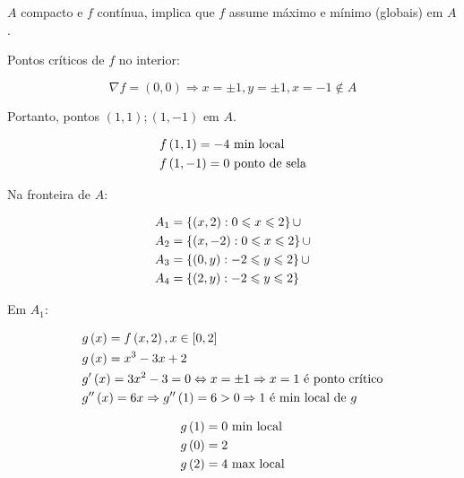 \documentclass[11pt, oneside, a4paper]{gsm-l}
\begin{document}
\begin{sol}
$A$ compacto e $f$ contínua, implica que $f$ assume máximo e mínimo (globais) em $A$.

Pontos críticos de $f$ no interior:

\[
    \nabla f = \left( {0,0} \right) \Rightarrow x =  \pm 1,y =  \pm 1,x =  - 1 \notin A
\]

Portanto, pontos $\left( {1,1} \right);\left( {1, - 1} \right)$ em $A$.

\[
\begin{gathered}
f\left( {1,1} \right) =  - 4{\text{ min local}} \hfill \\
f\left( {1, - 1} \right) = 0{\text{ ponto de sela}} \hfill \\
\end{gathered}
\]

Na fronteira de $A$:

\[
\begin{gathered}
      A_1  = \left\{ {\left( {x,2} \right):0 \leqslant x \leqslant 2} \right\} \cup  \hfill \\
      A_2  = \left\{ {\left( {x, - 2} \right):0 \leqslant x \leqslant 2} \right\} \cup  \hfill \\
      A_3  = \left\{ {\left( {0,y} \right): - 2 \leqslant y \leqslant 2} \right\} \cup  \hfill \\
      A_4  = \left\{ {\left( {2,y} \right): - 2 \leqslant y \leqslant 2} \right\} \hfill \\
\end{gathered}
\]

Em $A_1$:

\[
\begin{gathered}
      g\left( x \right) = f\left( {x,2} \right),x \in \left[ {0,2} \right] \hfill \\
g\left( x \right) = x^3  - 3x + 2 \hfill \\
      g'\left( x \right) = 3x^2  - 3 = 0 \Leftrightarrow x =  \pm 1 \Rightarrow x = 1{\text{ é ponto crítico}} \hfill \\
      g''\left( x \right) = 6x \Rightarrow g''\left( 1 \right) = 6 > 0 \Rightarrow 1{\text{ é min local de $g$}} \hfill \\
\end{gathered}
\]

\[
\begin{gathered}
g\left( 1 \right) = 0{\text{ min local}} \hfill \\
g\left( 0 \right) = 2 \hfill \\
g\left( 2 \right) = 4{\text{ max local}} \hfill \\
\end{gathered}
\]


\end{sol}
\end{document}
